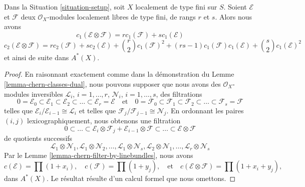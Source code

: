 \begin{lemma}
\label{lemma-chern-classes-tensor-product}
Dans la Situation \ref{situation-setup}, soit $X$ localement de type fini sur $S$.
Soient $\mathcal{E}$ et $\mathcal{F}$ deux
$\mathcal{O}_X$-modules localement libres de type fini, de rangs $r$ et $s$. Alors nous avons
$$
c_1(\mathcal{E} \otimes \mathcal{F})
=
r c_1(\mathcal{F}) + s c_1(\mathcal{E})
$$
$$
c_2(\mathcal{E} \otimes \mathcal{F})
=
r c_2(\mathcal{F}) + s c_2(\mathcal{E}) +
{r \choose 2} c_1(\mathcal{F})^2 +
(rs - 1) c_1(\mathcal{F})c_1(\mathcal{E}) +
{s \choose 2} c_1(\mathcal{E})^2
$$
et ainsi de suite dans $A^*(X)$.
\end{lemma}

\begin{proof}
En raisonnant exactement comme dans la démonstration du Lemme \ref{lemma-chern-classes-dual},
nous pouvons supposer que nous avons
des $\mathcal{O}_X$-modules inversibles
${\mathcal L}_i$, $i = 1, \ldots, r$,
${\mathcal N}_i$, $i = 1, \ldots, s$,
des filtrations
$$
0 = \mathcal{E}_0 \subset \mathcal{E}_1 \subset \mathcal{E}_2
\subset \ldots \subset \mathcal{E}_r = \mathcal{E}
\quad\text{et}\quad
0 = \mathcal{F}_0 \subset \mathcal{F}_1 \subset \mathcal{F}_2
\subset \ldots \subset \mathcal{F}_s = \mathcal{F}
$$
telles que $\mathcal{E}_i/\mathcal{E}_{i - 1} \cong \mathcal{L}_i$
et telles que $\mathcal{F}_j/\mathcal{F}_{j - 1} \cong \mathcal{N}_j$.
En ordonnant les paires $(i, j)$ lexicographiquement,
nous obtenons une filtration
$$
0 \subset \ldots \subset
\mathcal{E}_i \otimes \mathcal{F}_j
+
\mathcal{E}_{i - 1} \otimes \mathcal{F}
\subset \ldots \subset \mathcal{E} \otimes \mathcal{F}
$$
de quotients successifs
$$
\mathcal{L}_1 \otimes \mathcal{N}_1,
\mathcal{L}_1 \otimes \mathcal{N}_2,
\ldots,
\mathcal{L}_1 \otimes \mathcal{N}_s,
\mathcal{L}_2 \otimes \mathcal{N}_1,
\ldots,
\mathcal{L}_r \otimes \mathcal{N}_s
$$
Par le Lemme \ref{lemma-chern-filter-by-linebundles},
nous avons
$$
c(\mathcal{E}) = \prod (1 + x_i),
\quad
c(\mathcal{F}) = \prod (1 + y_j),
\quad\text{et}\quad
c(\mathcal{E} \otimes \mathcal{F}) = \prod (1 + x_i + y_j),
$$
dans $A^*(X)$. Le résultat résulte d'un calcul formel
que nous omettons.
\end{proof}

